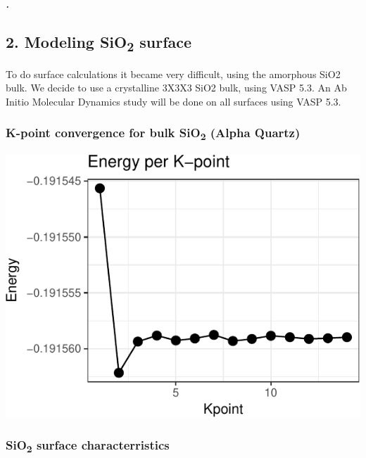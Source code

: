 \documentclass[]{article}
\let\oldsubparagraph\subparagraph
\renewcommand{\subparagraph}[1]{\oldsubparagraph{#1}\mbox{}}
\begin{document}
\hypertarget{section-3}{%
\subparagraph{.}\label{section-3}}

\hypertarget{modeling-sio2-surface}{%
\subsection{\texorpdfstring{2. Modeling SiO\textsubscript{2}
surface}{2. Modeling SiO2 surface}}\label{modeling-sio2-surface}}

To do surface calculations it became very difficult, using the amorphous
SiO2 bulk. We decide to use a crystalline 3X3X3 SiO2 bulk, using VASP
5.3. An Ab Initio Molecular Dynamics study will be done on all surfaces
using VASP 5.3.

\hypertarget{k-point-convergence-for-bulk-sio2-alpha-quartz}{%
\subsubsection{\texorpdfstring{K-point convergence for bulk
SiO\textsubscript{2} (Alpha
Quartz)}{K-point convergence for bulk SiO2 (Alpha Quartz)}}\label{k-point-convergence-for-bulk-sio2-alpha-quartz}}

\includegraphics{Report1_files/figure-latex/Graph:K-point convergence-1.pdf}

\hypertarget{sio2-surface-characterristics}{%
\subsubsection{\texorpdfstring{SiO\textsubscript{2} surface
characterristics}{SiO2 surface characterristics}}\label{sio2-surface-characterristics}}
\end{document}
